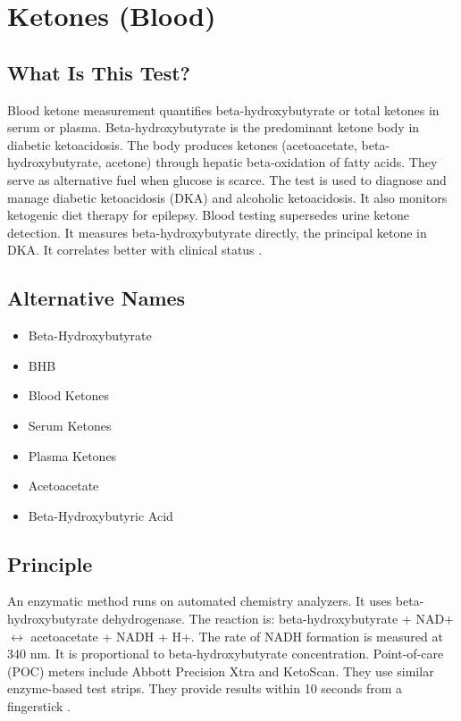 \chapter{Ketones (Blood)}

\section*{What Is This Test?}
Blood ketone measurement quantifies beta-hydroxybutyrate or total ketones in serum or plasma. Beta-hydroxybutyrate is the predominant ketone body in diabetic ketoacidosis. The body produces ketones (acetoacetate, beta-hydroxybutyrate, acetone) through hepatic beta-oxidation of fatty acids. They serve as alternative fuel when glucose is scarce. The test is used to diagnose and manage diabetic ketoacidosis (DKA) and alcoholic ketoacidosis. It also monitors ketogenic diet therapy for epilepsy. Blood testing supersedes urine ketone detection. It measures beta-hydroxybutyrate directly, the principal ketone in DKA. It correlates better with clinical status \cite{dhatariya2020diabetic}.

\section*{Alternative Names}
\begin{itemize}
  \item Beta-Hydroxybutyrate
  \item BHB
  \item Blood Ketones
  \item Serum Ketones
  \item Plasma Ketones
  \item Acetoacetate
  \item Beta-Hydroxybutyric Acid
\end{itemize}
\section*{Principle}
An enzymatic method runs on automated chemistry analyzers. It uses beta-hydroxybutyrate dehydrogenase. The reaction is: beta-hydroxybutyrate + NAD+ $\leftrightarrow$ acetoacetate + NADH + H+. The rate of NADH formation is measured at 340 nm. It is proportional to beta-hydroxybutyrate concentration. Point-of-care (POC) meters include Abbott Precision Xtra and KetoScan. They use similar enzyme-based test strips. They provide results within 10 seconds from a fingerstick \cite{arora2011point}.

